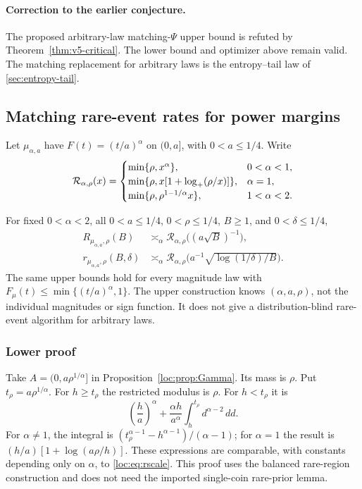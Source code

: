 \paragraph{Correction to the earlier conjecture.}
The proposed arbitrary-law matching-$\Psi$ upper bound is refuted by
Theorem~\ref{thm:v5-critical}. The lower bound and optimizer above remain
valid. The matching replacement for arbitrary laws is the
entropy--tail law of \cref{sec:entropy-tail}.

\subsection{Matching rare-event rates for power margins}\label{loc:sec:power}
Let $\mu_{\alpha,a}$ have $F(t)=(t/a)^\alpha$ on $(0,a]$, with $0<a\le1/4$. Write
\begin{equation}\label{loc:eq:rscale}
 \mathcal R_{\alpha,\rho}(x)=
 \begin{cases}
 \min\{\rho,x^\alpha\},&0<\alpha<1,\\
 \min\{\rho,x[1+\log_+(\rho/x)]\},&\alpha=1,\\
 \min\{\rho,\rho^{1-1/\alpha}x\},&1<\alpha<2.
 \end{cases}
\end{equation}
\begin{theorem}\label{loc:thm:power}
For fixed $0<\alpha<2$, all $0<a\le1/4$, $0<\rho\le1/4$, $B\ge1$, and $0<\delta\le1/4$,
\begin{align*}
 R_{\mu_{\alpha,a},\rho}(B)&\asymp_\alpha
 \mathcal R_{\alpha,\rho}\bigl((a\sqrt B)^{-1}\bigr),\\
 r_{\mu_{\alpha,a},\rho}(B,\delta)&\asymp_\alpha
 \mathcal R_{\alpha,\rho}\bigl(a^{-1}\sqrt{\log(1/\delta)/B}\bigr).
\end{align*}
The same upper bounds hold for every magnitude law with $F_\mu(t)\le\min\{(t/a)^\alpha,1\}$. The upper construction knows $(\alpha,a,\rho)$, not the individual magnitudes or sign function. It does not give a distribution-blind rare-event algorithm for arbitrary laws.
\end{theorem}

\subsubsection{Lower proof}
Take $A=(0,a\rho^{1/\alpha}]$ in Proposition~\ref{loc:prop:Gamma}. Its mass is $\rho$. Put $t_\rho=a\rho^{1/\alpha}$. For $h\ge t_\rho$ the restricted modulus is $\rho$. For $h<t_\rho$ it is
\begin{equation}\label{loc:eq:restrictedpower}
 \left(\frac h a\right)^\alpha+
 \frac{\alpha h}{a^\alpha}\int_h^{t_\rho}d^{\alpha-2}\,dd.
\end{equation}
For $\alpha\ne1$, the integral is
$(t_\rho^{\alpha-1}-h^{\alpha-1})/(\alpha-1)$; for $\alpha=1$ the result is
$(h/a)[1+\log(a\rho/h)]$. These expressions are comparable, with constants depending only on $\alpha$, to \eqref{loc:eq:rscale}. This proof uses the balanced rare-region construction and does not need the imported single-coin rare-prior lemma.

